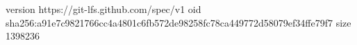 version https://git-lfs.github.com/spec/v1
oid sha256:a91e7c9821766cc4a4801c6fb572de98258fc78ca449772d58079ef34ffe79f7
size 1398236
